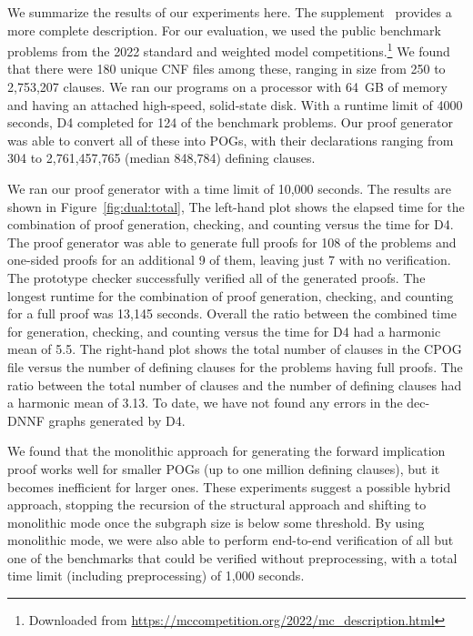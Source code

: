 \documentclass[letterpaper,USenglish,cleveref, autoref, thm-restate]{lipics-v2021}
\newcommand{\progname}[1]{\textsc{#1}}
\newcommand{\dfour}{\progname{D4}}
\begin{document}
We summarize the results of our experiments here.
The supplement~\cite{bryant:sat:2023:supplement}
provides a more complete description. For our
evaluation, we used the public benchmark problems from the 2022
standard and weighted model competitions.\footnote{Downloaded from \url{https://mccompetition.org/2022/mc_description.html}}  We found that there were
180 unique CNF files among these, ranging in size from 250 to
2,753,207 clauses.
We ran our programs on a processor with 64~GB of
memory and having an attached high-speed, solid-state
disk.
With a runtime limit of 4000 seconds, \dfour{} completed for 124 of the
benchmark problems.  Our proof generator was able to convert all of
these into POGs, with their declarations ranging from 304 to
2,761,457,765 (median 848,784) defining clauses.

We ran our proof generator with a time limit of 10,000 seconds.  The
results are shown in Figure~\ref{fig:dual:total}, The left-hand plot
shows the elapsed time for the combination of proof generation,
checking, and counting versus the time for
\dfour{}.
The proof generator was able to generate full proofs for 108 of the problems and
one-sided proofs for an additional 9 of them, leaving just 7 with no
verification.  The prototype checker successfully verified all of the generated
proofs.  The longest runtime for the combination of proof generation, checking, and counting
for a full proof was 13,145 seconds.
Overall the ratio
between the combined time for generation, checking, and counting versus the time
for \dfour{} had a harmonic mean of 5.5.
The right-hand plot shows the total number of clauses in the CPOG file versus the number of defining clauses for the problems having full proofs.
The ratio between the total number of clauses and the number of defining clauses had a harmonic mean of 3.13.
To date, we have not found
any errors in the dec-DNNF graphs generated by \dfour{}.

We found that the monolithic approach for generating the forward
implication proof works well for smaller POGs (up to one million
defining clauses), but it becomes inefficient for larger ones.  These
experiments suggest a possible hybrid approach, stopping the recursion
of the structural approach and shifting to monolithic mode once the
subgraph size is below some threshold.  By using monolithic mode, we
were also able to perform end-to-end verification of all but one of the
benchmarks that could be verified without preprocessing, with a total
time limit (including preprocessing) of 1,000 seconds.
\end{document}
